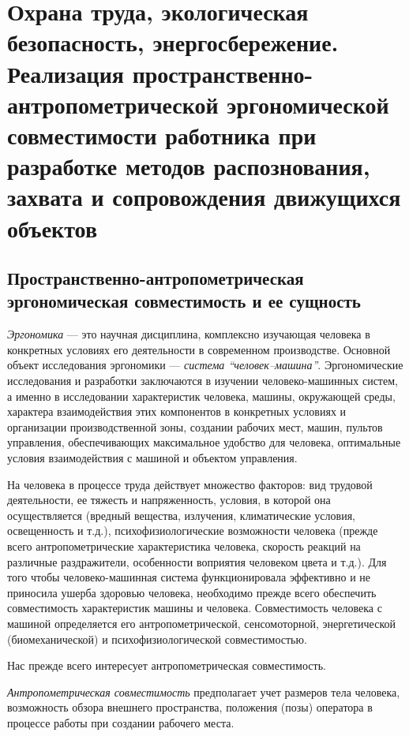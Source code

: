 \section{Охрана труда, экологическая безопасность, энергосбережение. Реализация пространственно\hyp{}антропометрической эргономической совместимости работника при разработке методов распознования, захвата и сопровождения движущихся объектов}

\subsection{Пространственно\hyp{}антропометрическая эргономическая совместимость и ее сущность}
\emph{Эргономика} --- это научная дисциплина, комплексно изучающая человека в конкретных условиях его деятельности в современном производстве. Основной объект исследования эргономики --- \emph{система ``человек--машина''}. Эргономические исследования и разработки заключаются в изучении человеко\hyp{}машинных систем, а именно в исследовании характеристик человека, машины, окружающей среды, характера взаимодействия этих компонентов в конкретных условиях и организации производственной зоны, создании рабочих мест, машин, пультов управления, обеспечивающих максимальное удобство для человека, оптимальные условия взаимодействия с машиной и объектом управления.\cite{devisilov09}

На человека в процессе труда действует множество факторов: вид трудовой деятельности, ее тяжесть и напряженность, условия, в которой она осуществляется (вредный вещества, излучения, климатические условия, освещенность и т.д.), психофизиологические возможности человека (прежде всего антропометрические характеристика человека, скорость реакций на различные раздражители, особенности воприятия человеком цвета и т.д.). Для того чтобы человеко\hyp{}машинная система функционировала эффективно и не приносила ушерба здоровью человека, необходимо прежде всего обеспечить совместимость характеристик машины и человека. Совместимость человека с машиной определяется его антропометрической, сенсомоторной, энергетической (биомеханической) и психофизиологической совместимостью.\cite{devisilov09}

Нас прежде всего интересует антропометрическая совместимость.

\emph{Антропометрическая совместимость} предполагает учет размеров тела человека, возможность обзора внешнего пространства, положения (позы) оператора в процессе работы при создании рабочего места.\cite{devisilov09}

